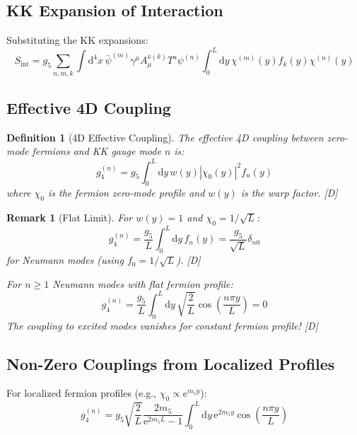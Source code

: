 \documentclass[11pt,a4paper]{article}
\newtheorem{definition}[theorem]{Definition}
\newtheorem{remark}[theorem]{Remark}
\newcommand{\dd}{\mathrm{d}}
\newcommand{\ee}{\mathrm{e}}
\begin{document}
\subsection{KK Expansion of Interaction}

Substituting the KK expansions:
\begin{equation}
S_{\text{int}} = g_5 \sum_{n,m,k} \int \dd^4x\, \bar{\psi}^{(m)} \gamma^\mu A_\mu^{a(k)} T^a \psi^{(n)}
\int_0^L \dd y\, \chi^{(m)}(y) f_k(y) \chi^{(n)}(y)
\label{eq:int-expanded}
\end{equation}

\subsection{Effective 4D Coupling}

\begin{definition}[4D Effective Coupling]
\label{def:g4}
The effective 4D coupling between zero-mode fermions and KK gauge mode $n$ is:
\begin{equation}
\boxed{
g_4^{(n)} = g_5 \int_0^L \dd y\, w(y) |\chi_0(y)|^2 f_n(y)
}
\label{eq:g4-def}
\end{equation}
where $\chi_0$ is the fermion zero-mode profile and $w(y)$ is the warp factor. [D]
\end{definition}

\begin{remark}[Flat Limit]
For $w(y) = 1$ and $\chi_0 = 1/\sqrt{L}$:
\begin{equation}
g_4^{(n)} = \frac{g_5}{L} \int_0^L \dd y\, f_n(y) = \frac{g_5}{\sqrt{L}} \delta_{n0}
\label{eq:g4-flat-zero}
\end{equation}
for Neumann modes (using $f_0 = 1/\sqrt{L}$). [D]

For $n \geq 1$ Neumann modes with flat fermion profile:
\begin{equation}
g_4^{(n)} = \frac{g_5}{L} \int_0^L \dd y\, \sqrt{\frac{2}{L}} \cos\left(\frac{n\pi y}{L}\right) = 0
\label{eq:g4-flat-n}
\end{equation}
The coupling to excited modes vanishes for constant fermion profile! [D]
\end{remark}

\subsection{Non-Zero Couplings from Localized Profiles}

For localized fermion profiles (e.g., $\chi_0 \propto \ee^{m_5 y}$):
\begin{equation}
g_4^{(n)} = g_5 \sqrt{\frac{2}{L}} \frac{2m_5}{\ee^{2m_5 L} - 1}
\int_0^L \dd y\, \ee^{2m_5 y} \cos\left(\frac{n\pi y}{L}\right)
\label{eq:g4-localized}
\end{equation}
\end{document}
